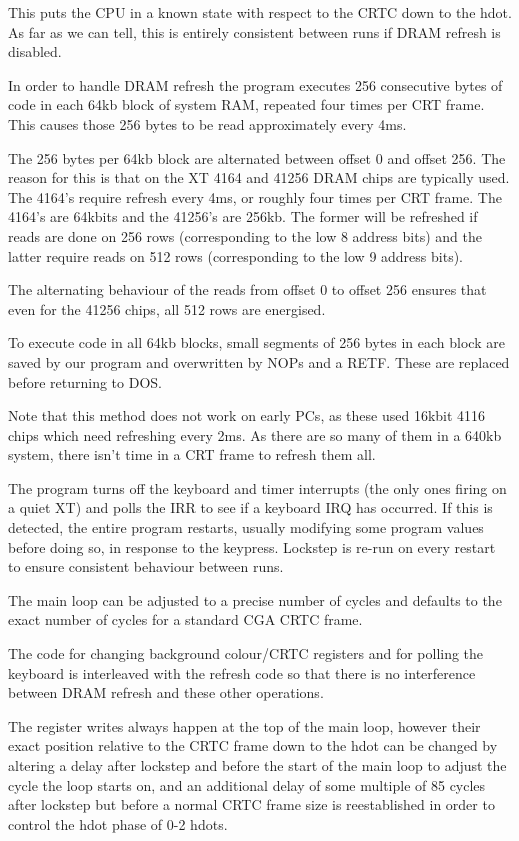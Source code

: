 \documentclass[a4paper,10pt]{amsart}
\begin{document}
This puts the CPU in a known state with respect to the CRTC down to the hdot.
As far as we can tell, this is entirely consistent between runs if DRAM refresh
is disabled.

In order to handle DRAM refresh the program executes 256 consecutive bytes of
code in each 64kb block of system RAM, repeated four times per CRT frame. This
causes those 256 bytes to be read approximately every 4ms.

The 256 bytes per 64kb block are alternated between offset 0 and offset 256.
The reason for this is that on the XT 4164 and 41256 DRAM chips are typically
used. The 4164's require refresh every 4ms, or roughly four times per CRT
frame. The 4164's are 64kbits and the 41256's are 256kb. The former will be
refreshed if reads are done on 256 rows (corresponding to the low 8 address
bits) and the latter require reads on 512 rows (corresponding to the low 9
address bits).

The alternating behaviour of the reads from offset 0 to offset 256 ensures
that even for the 41256 chips, all 512 rows are energised.

To execute code in all 64kb blocks, small segments of 256 bytes in each block
are saved by our program and overwritten by NOPs and a RETF. These are replaced
before returning to DOS.

Note that this method does not work on early PCs, as these used 16kbit 4116
chips which need refreshing every 2ms. As there are so many of them in a 640kb
system, there isn't time in a CRT frame to refresh them all.

The program turns off the keyboard and timer interrupts (the only ones firing
on a quiet XT) and polls the IRR to see if a keyboard IRQ has occurred. If this
is detected, the entire program restarts, usually modifying some program values
before doing so, in response to the keypress. Lockstep is re-run on every
restart to ensure consistent behaviour between runs.

The main loop can be adjusted to a precise number of cycles and defaults to the
exact number of cycles for a standard CGA CRTC frame.

The code for changing background colour/CRTC registers and for polling the
keyboard is interleaved with the refresh code so that there is no interference
between DRAM refresh and these other operations.

The register writes always happen at the top of the main loop, however their
exact position relative to the CRTC frame down to the hdot can be changed
by altering a delay after lockstep and before the start of the main loop to
adjust the cycle the loop starts on, and an additional delay of some multiple
of 85 cycles after lockstep but before a normal CRTC frame size is
reestablished in order to control the hdot phase of 0-2 hdots.
\end{document}
